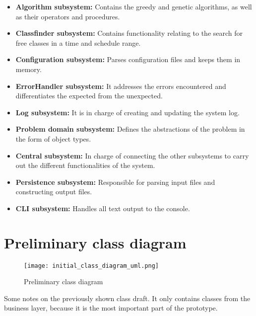\begin{itemize}

    \item \textbf{Algorithm subsystem:} Contains the greedy and genetic algorithms, as well as their operators and procedures.

    \item \textbf{Classfinder subsystem:} Contains functionality relating to the search for free classes in a time and schedule range.

    \item \textbf{Configuration subsystem:} Parses configuration files and keeps them in memory.

    \item \textbf{ErrorHandler subsystem:} It addresses the errors encountered and differentiates the expected from the unexpected.

    \item \textbf{Log subsystem:} It is in charge of creating and updating the system log.

    \item \textbf{Problem domain subsystem:} Defines the abstractions of the problem in the form of object types.

    \item \textbf{Central subsystem:} In charge of connecting the other subsystems to carry out the different functionalities of the system.

    \item \textbf{Persistence subsystem:} Responsible for parsing input files and constructing output files.

    \item \textbf{CLI subsystem:} Handles all text output to the console.

\end{itemize}




\section{Preliminary class diagram}


\begin{figure}[H]
    \caption{Preliminary class diagram}
  \centering
  \texttt{[image: initial\_class\_diagram\_uml.png]}
\end{figure}

Some notes on the previously shown class draft. It only contains classes from the business layer, because it is the most important part of the prototype.

